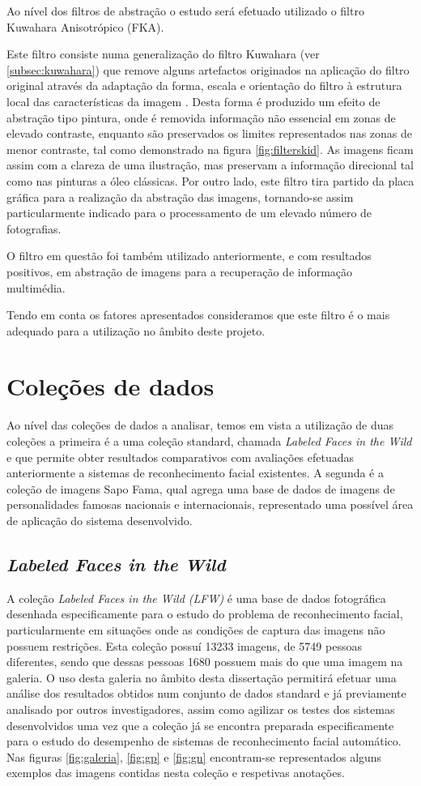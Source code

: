 Ao nível dos filtros de abstração o estudo será efetuado utilizado o filtro Kuwahara Anisotrópico (FKA).

Este filtro consiste numa generalização do filtro Kuwahara (ver \ref{subsec:kuwahara}) que remove alguns artefactos originados na aplicação do filtro original através da adaptação da forma, escala e orientação do filtro à estrutura local das características da imagem \cite{Kyprianidis2009}. Desta forma é produzido um efeito de abstração tipo pintura, onde é removida informação não essencial em zonas de elevado contraste, enquanto são preservados os limites representados nas zonas de menor contraste, tal como demonstrado na figura \ref{fig:filterskid}. As imagens ficam assim com a clareza de uma ilustração, mas preservam a informação direcional tal como nas pinturas a óleo clássicas. Por outro lado, este filtro tira partido da placa gráfica para a realização da abstração das imagens, tornando-se assim particularmente indicado para o processamento de um elevado número de fotografias.

O filtro em questão foi também utilizado anteriormente, e com resultados positivos, em abstração de imagens para a recuperação de informação multimédia. 

Tendo em conta os fatores apresentados consideramos que este filtro é o mais adequado para a utilização no âmbito deste projeto.

\section{Coleções de dados}
Ao nível das coleções de dados a analisar, temos em vista a utilização de duas coleções a primeira é a uma coleção standard, chamada \textit{Labeled Faces in the Wild} e que permite obter resultados comparativos com avaliações efetuadas anteriormente a sistemas de reconhecimento facial existentes. A segunda é a coleção de imagens Sapo Fama, qual agrega uma base de dados de imagens de personalidades famosas nacionais e internacionais, representado uma possível área de aplicação do sistema desenvolvido.

\subsection{\textit{Labeled Faces in the Wild}}
A coleção \textit{Labeled Faces in the Wild (LFW)} é uma base de dados fotográfica desenhada especificamente para o estudo do problema de reconhecimento facial, particularmente em situações onde as condições de captura das imagens não possuem restrições. Esta coleção possuí 13233 imagens, de 5749 pessoas diferentes, sendo que dessas pessoas 1680 possuem mais do que uma imagem na galeria. O uso desta galeria no âmbito desta dissertação permitirá efetuar uma análise dos resultados obtidos num conjunto de dados standard e já previamente analisado por outros investigadores, assim como agilizar os testes dos sistemas desenvolvidos uma vez que a coleção já se encontra preparada especificamente para o estudo do desempenho de sistemas de reconhecimento facial automático. Nas figuras \ref{fig:galeria}, \ref{fig:gp} e \ref{fig:gn} encontram-se representados alguns exemplos das imagens contidas nesta coleção e respetivas anotações.


